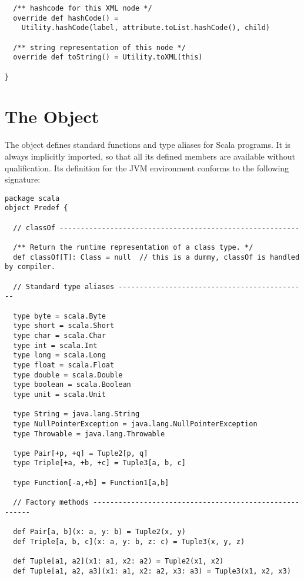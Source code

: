 {\begin{lstlisting}
  /** hashcode for this XML node */
  override def hashCode() = 
    Utility.hashCode(label, attribute.toList.hashCode(), child) 

  /** string representation of this node */
  override def toString() = Utility.toXML(this) 

}
\end{lstlisting}

\newpage
\section{The \large{} Object}\label{cls:predef}

The  object defines standard functions and type aliases
for Scala programs. It is always implicitly imported, so that all its
defined members are available without qualification. Its definition
for the JVM environment conforms to the following signature:

\begin{lstlisting}
package scala
object Predef {

  // classOf ---------------------------------------------------------

  /** Return the runtime representation of a class type. */
  def classOf[T]: Class = null  // this is a dummy, classOf is handled by compiler.

  // Standard type aliases ---------------------------------------------

  type byte = scala.Byte
  type short = scala.Short
  type char = scala.Char
  type int = scala.Int
  type long = scala.Long
  type float = scala.Float
  type double = scala.Double
  type boolean = scala.Boolean
  type unit = scala.Unit

  type String = java.lang.String
  type NullPointerException = java.lang.NullPointerException
  type Throwable = java.lang.Throwable

  type Pair[+p, +q] = Tuple2[p, q]
  type Triple[+a, +b, +c] = Tuple3[a, b, c]

  type Function[-a,+b] = Function1[a,b]

  // Factory methods -------------------------------------------------------

  def Pair[a, b](x: a, y: b) = Tuple2(x, y)
  def Triple[a, b, c](x: a, y: b, z: c) = Tuple3(x, y, z)

  def Tuple[a1, a2](x1: a1, x2: a2) = Tuple2(x1, x2)
  def Tuple[a1, a2, a3](x1: a1, x2: a2, x3: a3) = Tuple3(x1, x2, x3)


\end{lstlisting}}
